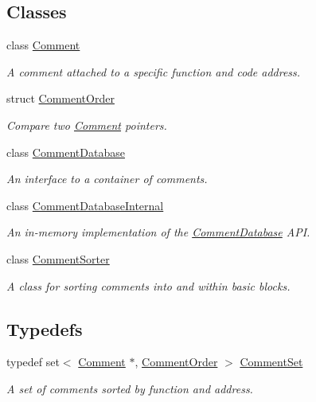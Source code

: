 \subsection*{Classes}
\begin{DoxyCompactItemize}
\item 
class \mbox{\hyperlink{class_comment}{Comment}}
\begin{DoxyCompactList}\small\item\em A comment attached to a specific function and code address. \end{DoxyCompactList}\item 
struct \mbox{\hyperlink{struct_comment_order}{Comment\+Order}}
\begin{DoxyCompactList}\small\item\em Compare two \mbox{\hyperlink{class_comment}{Comment}} pointers. \end{DoxyCompactList}\item 
class \mbox{\hyperlink{class_comment_database}{Comment\+Database}}
\begin{DoxyCompactList}\small\item\em An interface to a container of comments. \end{DoxyCompactList}\item 
class \mbox{\hyperlink{class_comment_database_internal}{Comment\+Database\+Internal}}
\begin{DoxyCompactList}\small\item\em An in-\/memory implementation of the \mbox{\hyperlink{class_comment_database}{Comment\+Database}} A\+PI. \end{DoxyCompactList}\item 
class \mbox{\hyperlink{class_comment_sorter}{Comment\+Sorter}}
\begin{DoxyCompactList}\small\item\em A class for sorting comments into and within basic blocks. \end{DoxyCompactList}\end{DoxyCompactItemize}
\subsection*{Typedefs}
\begin{DoxyCompactItemize}
\item 
typedef set$<$ \mbox{\hyperlink{class_comment}{Comment}} $\ast$, \mbox{\hyperlink{struct_comment_order}{Comment\+Order}} $>$ \mbox{\hyperlink{comment_8hh_ae1761d5e0f74b5d5ced1d74ec869cc73}{Comment\+Set}}
\begin{DoxyCompactList}\small\item\em A set of comments sorted by function and address. \end{DoxyCompactList}\end{DoxyCompactItemize}


